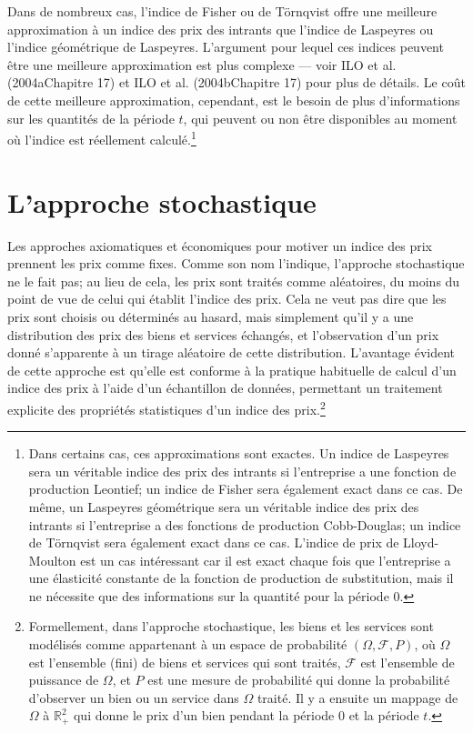 \documentclass[
]{article}
\begin{document}
Dans de nombreux cas, l'indice de Fisher ou de Törnqvist offre une meilleure approximation à un indice des prix des intrants que l'indice de Laspeyres ou l'indice géométrique de Laspeyres. L'argument pour lequel ces indices peuvent être une meilleure approximation est plus complexe --- voir ILO et al. (2004aChapitre 17) et ILO et al. (2004bChapitre 17) pour plus de détails. Le coût de cette meilleure approximation, cependant, est le besoin de plus d'informations sur les quantités de la période \(t\), qui peuvent ou non être disponibles au moment où l'indice est réellement calculé.\footnote{Dans certains cas, ces approximations sont exactes. Un indice de Laspeyres sera un véritable indice des prix des intrants si l'entreprise a une fonction de production Leontief; un indice de Fisher sera également exact dans ce cas. De même, un Laspeyres géométrique sera un véritable indice des prix des intrants si l'entreprise a des fonctions de production Cobb-Douglas; un indice de Törnqvist sera également exact dans ce cas. L'indice de prix de Lloyd-Moulton est un cas intéressant car il est exact chaque fois que l'entreprise a une élasticité constante de la fonction de production de substitution, mais il ne nécessite que des informations sur la quantité pour la période 0.}

\hypertarget{lapproche-stochastique}{%
\section{L'approche stochastique}\label{lapproche-stochastique}}

Les approches axiomatiques et économiques pour motiver un indice des prix prennent les prix comme fixes. Comme son nom l'indique, l'approche stochastique ne le fait pas; au lieu de cela, les prix sont traités comme aléatoires, du moins du point de vue de celui qui établit l'indice des prix. Cela ne veut pas dire que les prix sont choisis ou déterminés au hasard, mais simplement qu'il y a une distribution des prix des biens et services échangés, et l'observation d'un prix donné s'apparente à un tirage aléatoire de cette distribution. L'avantage évident de cette approche est qu'elle est conforme à la pratique habituelle de calcul d'un indice des prix à l'aide d'un échantillon de données, permettant un traitement explicite des propriétés statistiques d'un indice des prix.\footnote{Formellement, dans l'approche stochastique, les biens et les services sont modélisés comme appartenant à un espace de probabilité \((\Omega, \mathcal{F}, P)\), où \(\Omega\) est l'ensemble (fini) de biens et services qui sont traités, \(\mathcal{F}\) est l'ensemble de puissance de \(\Omega\), et \(P\) est une mesure de probabilité qui donne la probabilité d'observer un bien ou un service dans \(\Omega\) traité. Il y a ensuite un mappage de \(\Omega\) à \(\mathbb{R}_{+}^{2}\) qui donne le prix d'un bien pendant la période 0 et la période \(t\).}
\end{document}

